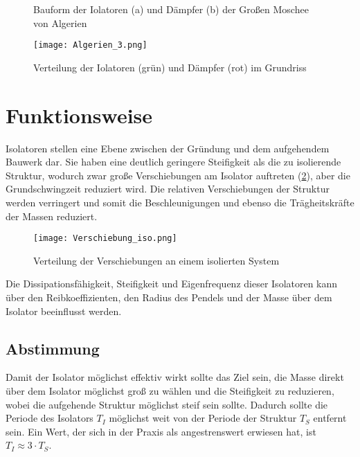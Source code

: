 \begin{figure}[H]
    \centering
    \qquad
    \caption{Bauform der Iolatoren (a) und Dämpfer (b) der Großen Moschee von Algerien \cite{AKK}}%
\end{figure}

\begin{figure}[H]
    \centering
    \texttt{[image: Algerien\_3.png]}
    \caption{Verteilung der Iolatoren (grün) und Dämpfer (rot) im Grundriss \cite{AKK}}
	\label{Dampener}
\end{figure}

\pagebreak

\section{Funktionsweise}
\label{sec:funktion}

Isolatoren stellen eine Ebene zwischen der Gründung und dem aufgehendem Bauwerk dar. Sie haben eine deutlich geringere Steifigkeit als die zu isolierende Struktur, wodurch zwar große Verschiebungen am Isolator auftreten (\cref{Verteilung}), aber die Grundschwingzeit reduziert wird.
Die relativen Verschiebungen der Struktur werden verringert und somit die Beschleunigungen und ebenso die Trägheitskräfte der Massen reduziert.

\begin{figure}[h]
    \centering
    \texttt{[image: Verschiebung\_iso.png]}
    \caption{Verteilung der Verschiebungen an einem isolierten System \cite{Kelly}}
	\label{Verteilung}
\end{figure}

Die Dissipationsfähigkeit, Steifigkeit und Eigenfrequenz dieser Isolatoren kann über den Reibkoeffizienten, den Radius des Pendels und der Masse über dem Isolator beeinflusst werden.

\subsection{Abstimmung}
\label{sec:abstimmung}

Damit der Isolator möglichst effektiv wirkt sollte das Ziel sein, die Masse direkt über dem Isolator möglichst groß zu wählen und die Steifigkeit zu reduzieren, wobei die aufgehende Struktur möglichst steif sein sollte.
Dadurch sollte die Periode des Isolators $T_I$ möglichst weit von der Periode der Struktur $T_S$ entfernt sein.
Ein Wert, der sich in der Praxis als angestrenswert erwiesen hat, ist $T_I \approx 3 \cdot T_S$.

